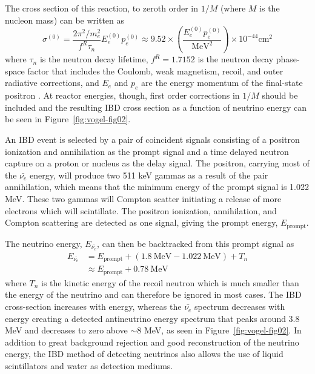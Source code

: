 The cross section of this reaction, to zeroth order in $1/M$ (where $M$ is the nucleon mass) can be written as
\begin{equation}
\sigma^{(0)} = \frac{2\pi^2/m_e^2}{{f^R}\tau_n}E_e^{(0)}p_e^{(0)} \approx 9.52 \times \left(\frac{E_e^{(0)}p_e^{(0)}}{\textrm{MeV}^2}\right) \times 10^{-44}\textrm{cm}^2
\end{equation}
where $\tau_n$ is the neutron decay lifetime, $f^R = 1.7152$ is the neutron decay phase-space factor that includes the Coulomb, weak magnetism, recoil, and outer radiative corrections, and $E_e$ and $p_e$ are the energy momentum of the final-state positron \cite{HayesVogel}.
At reactor energies, though, first order corrections in $1/M$ should be included \cite{Vogel:1999zy} and the resulting IBD cross section as a function of neutrino energy can be seen in Figure~\ref{fig:vogel-fig02}.


An IBD event is selected by a pair of coincident signals consisting of a positron ionization and annihilation as the prompt signal and a time delayed neutron capture on a proton or nucleus as the delay signal. 
The positron, carrying most of the $\bar{\nu_{e}}$ energy, will produce two 511 keV gammas as a result of the pair annihilation, which means that the minimum energy of the prompt signal is 1.022 MeV.
These two gammas will Compton scatter initiating a release of more electrons which will scintillate.
The positron ionization, annihilation, and Compton scattering are detected as one signal, giving the prompt energy, $E_{\textrm{prompt}}$.

The neutrino energy, $E_{\bar{\nu_{e}}}$, can then be backtracked from this prompt signal as 
\begin{equation}
\begin{split}
	E_{\bar{\nu_{e}}} &= E_{\textrm{prompt}} + (1.8~\textrm{MeV} - 1.022~\textrm{MeV}) + T_n \\
			&\approx E_{\textrm{prompt}} + 0.78~\textrm{MeV}
\end{split}
\end{equation}
where $T_n$ is the kinetic energy of the recoil neutron which is much smaller than the energy of the neutrino and can therefore be ignored in most cases. 
The IBD cross-section increases with energy, whereas the $\bar{\nu_{e}}$ spectrum decreases with energy creating a detected antineutrino energy spectrum that peaks around 3.8 MeV and decreases to zero above $\sim$8 MeV, as seen in Figure~\ref{fig:vogel-fig02}. 
In addition to great background rejection and good reconstruction of the neutrino energy, the IBD method of detecting neutrinos also allows the use of liquid scintillators and water as detection mediums. 

